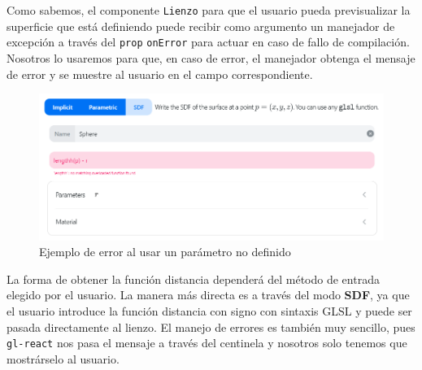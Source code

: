 Como sabemos, el componente \texttt{Lienzo} para que el usuario pueda previsualizar la superficie que está definiendo puede recibir como argumento un manejador de excepción a través del \texttt{prop} \texttt{onError} para actuar en caso de fallo de compilación. Nosotros lo usaremos para que, en caso de error, el manejador obtenga el mensaje de error y se muestre al usuario en el campo correspondiente.\newline
\begin{figure}[ht!]
    \centering
    \includegraphics[width=\textwidth]{Plantilla-TFG-master/img/error.png}
    \caption{Ejemplo de error al usar un parámetro no definido}
\end{figure}

La forma de obtener la función distancia dependerá del método de entrada elegido por el usuario. La manera más directa es a través del modo \textbf{SDF}, ya que el usuario introduce la función distancia con signo con sintaxis GLSL y puede ser pasada directamente al lienzo. El manejo de errores es también muy sencillo, pues \texttt{gl-react} nos pasa el mensaje a través del centinela y nosotros solo tenemos que mostrárselo al usuario.\newline

